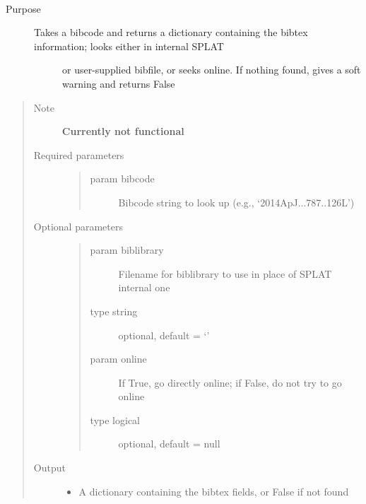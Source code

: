 \documentclass[letterpaper,10pt,english]{sphinxmanual}
\begin{document}
\begin{fulllineitems}
\label{api:splat_db.getBibTex}~\begin{description}
\item[{Purpose}] \leavevmode\begin{description}
\item[{Takes a bibcode and returns a dictionary containing the bibtex information; looks either in internal SPLAT}] \leavevmode
or user-supplied bibfile, or seeks online. If nothing found, gives a soft warning and returns False

\end{description}

\end{description}
\begin{quote}\begin{description}
\item[{Note}] \leavevmode
\textbf{Currently not functional}

\item[{Required parameters}] \leavevmode\begin{quote}\begin{description}
\item[{param bibcode}] \leavevmode
Bibcode string to look up (e.g., `2014ApJ...787..126L')

\end{description}\end{quote}

\item[{Optional parameters}] \leavevmode\begin{quote}\begin{description}
\item[{param biblibrary}] \leavevmode
Filename for biblibrary to use in place of SPLAT internal one

\item[{type string}] \leavevmode
optional, default = `'

\item[{param online}] \leavevmode
If True, go directly online; if False, do not try to go online

\item[{type logical}] \leavevmode
optional, default = null

\end{description}\end{quote}

\item[{Output}] \leavevmode\begin{itemize}
\item {} 
A dictionary containing the bibtex fields, or False if not found

\end{itemize}

\end{description}\end{quote}

\end{fulllineitems}
\end{document}
